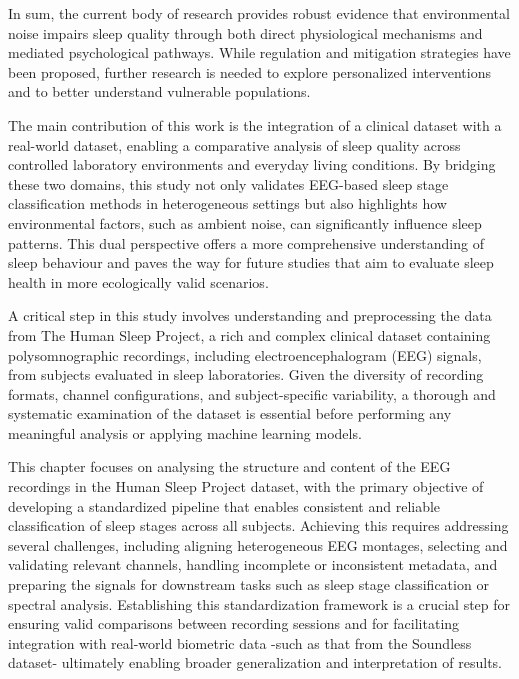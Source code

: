 In sum, the current body of research provides robust evidence that environmental noise impairs sleep quality through both direct physiological mechanisms and mediated psychological pathways. While regulation and mitigation strategies have been proposed, further research is needed to explore personalized interventions and to better understand vulnerable populations.

The main contribution of this work is the integration of a clinical dataset with a real-world dataset, enabling a comparative analysis of sleep quality across controlled laboratory environments and everyday living conditions. By bridging these two domains, this study not only validates EEG-based sleep stage classification methods in heterogeneous settings but also highlights how environmental factors, such as ambient noise, can significantly influence sleep patterns. This dual perspective offers a more comprehensive understanding of sleep behaviour and paves the way for future studies that aim to evaluate sleep health in more ecologically valid scenarios.

A critical step in this study involves understanding and preprocessing the data from The Human Sleep Project, a rich and complex clinical dataset containing polysomnographic recordings, including electroencephalogram (EEG) signals, from subjects evaluated in sleep laboratories. Given the diversity of recording formats, channel configurations, and subject-specific variability, a thorough and systematic examination of the dataset is essential before performing any meaningful analysis or applying machine learning models.

This chapter focuses on analysing the structure and content of the EEG recordings in the Human Sleep Project dataset, with the primary objective of developing a standardized pipeline that enables consistent and reliable classification of sleep stages across all subjects. Achieving this requires addressing several challenges, including aligning heterogeneous EEG montages, selecting and validating relevant channels, handling incomplete or inconsistent metadata, and preparing the signals for downstream tasks such as sleep stage classification or spectral analysis. Establishing this standardization framework is a crucial step for ensuring valid comparisons between recording sessions and for facilitating integration with real-world biometric data -such as that from the Soundless dataset- ultimately enabling broader generalization and interpretation of results.

